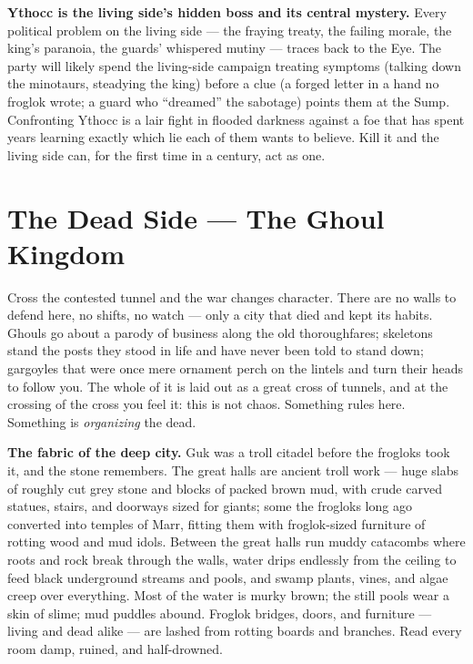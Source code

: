 \documentclass[10pt,twoside]{report}
\begin{document}
\begin{gmnote}
\textbf{Ythocc is the living side's hidden boss and its central mystery.} Every political problem on the living side --- the fraying treaty, the failing morale, the king's paranoia, the guards' whispered mutiny --- traces back to the Eye. The party will likely spend the living-side campaign treating symptoms (talking down the minotaurs, steadying the king) before a clue (a forged letter in a hand no froglok wrote; a guard who ``dreamed'' the sabotage) points them at the Sump. Confronting Ythocc is a lair fight in flooded darkness against a foe that has spent years learning exactly which lie each of them wants to believe. Kill it and the living side can, for the first time in a century, act as one.
\end{gmnote}

\clearpage

\section{The Dead Side --- The Ghoul Kingdom}
\begin{readaloud}
Cross the contested tunnel and the war changes character. There are no walls to defend here, no shifts, no watch --- only a city that died and kept its habits. Ghouls go about a parody of business along the old thoroughfares; skeletons stand the posts they stood in life and have never been told to stand down; gargoyles that were once mere ornament perch on the lintels and turn their heads to follow you. The whole of it is laid out as a great cross of tunnels, and at the crossing of the cross you feel it: this is not chaos. Something rules here. Something is \emph{organizing} the dead.
\end{readaloud}

\noindent \textbf{The fabric of the deep city.} Guk was a troll citadel before the frogloks took it, and the stone remembers. The great halls are ancient troll work --- huge slabs of roughly cut grey stone and blocks of packed brown mud, with crude carved statues, stairs, and doorways sized for giants; some the frogloks long ago converted into temples of Marr, fitting them with froglok-sized furniture of rotting wood and mud idols. Between the great halls run muddy catacombs where roots and rock break through the walls, water drips endlessly from the ceiling to feed black underground streams and pools, and swamp plants, vines, and algae creep over everything. Most of the water is murky brown; the still pools wear a skin of slime; mud puddles abound. Froglok bridges, doors, and furniture --- living and dead alike --- are lashed from rotting boards and branches. Read every room damp, ruined, and half-drowned.
\end{document}

